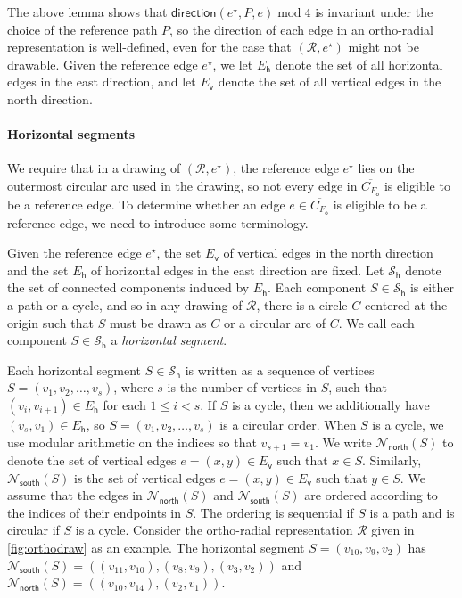 \documentclass{article}\usepackage[a4paper,margin=20mm]{geometry}
\newcommand{\RR}{\mathcal{R}}
\newcommand{\FO}{F_\mathsf{o}}
\newcommand{\EH}{E_\mathsf{h}}
\newcommand{\EV}{E_\mathsf{v}}
\newcommand{\PH}{\mathcal{S}_\mathsf{h}}
\newcommand{\Nnorth}{\mathcal{N}_\mathsf{north}}
\newcommand{\Nsouth}{\mathcal{N}_\mathsf{south}}
\newcommand{\direction}{\mathsf{direction}}
\newcommand{\eref}{e^\star}
\renewcommand{\mod}{\operatorname{mod}}
\begin{document}
The above lemma shows that $\direction(\eref, P, e) \mod 4$ is invariant under the choice of the reference path $P$, so the direction of each edge in an ortho-radial representation is well-defined, even for the case that  $(\RR, \eref)$ might not be drawable. Given the reference edge $\eref$, we let $\EH$ denote the set of all horizontal edges in the east direction, and let $\EV$ denote the set of all vertical edges in the north direction.



\paragraph{Horizontal segments} 
We require that in a drawing of $(\RR, \eref)$, the reference edge $\eref$ lies on the outermost circular arc used in the drawing, so not every edge in $\overline{C_{\FO}}$ is eligible to be a reference edge. To determine whether an edge $e \in \overline{C_{\FO}}$ is eligible to be a reference edge, we need to introduce some terminology.

Given the reference edge $\eref$, the set $\EV$ of vertical edges in the north direction  and the set $\EH$ of horizontal edges in the east direction  are fixed.
Let $\PH$ denote the set of connected components induced by $\EH$. Each component $S \in \PH$ is either a path or a cycle, and so in any drawing of $\RR$, there is a circle $C$ centered at the origin such that $S$ must be drawn as $C$ or a circular arc of $C$. We call each component $S \in \PH$ a \emph{horizontal segment}.

Each horizontal segment $S \in \PH$ is written as a sequence of vertices $S=(v_1, v_2, \ldots, v_s)$, where $s$ is the number of vertices in $S$, such that $(v_i, v_{i+1}) \in \EH$ for each $1 \leq i < s$. If $S$ is a cycle, then we additionally have $(v_s, v_1) \in \EH$, so $S=(v_1, v_2, \ldots, v_s)$ is a circular order. When $S$ is a cycle, we use modular arithmetic on the indices so that $v_{s+1} = v_1$.
We write $\Nnorth(S)$ to denote the set of vertical edges $e = (x,y) \in \EV$ such that $x \in S$. Similarly, $\Nsouth(S)$ is the set of vertical edges $e = (x,y) \in \EV$ such that $y \in S$. We assume that the edges  in $\Nnorth(S)$ and $\Nsouth(S)$ are ordered according to the indices of their endpoints in $S$. The ordering is sequential if $S$ is a path and is circular if $S$ is a cycle. 
Consider the ortho-radial representation $\RR$ given in \cref{fig:orthodraw} as an example. The horizontal segment $S = (v_{10}, v_9, v_2)$ has $\Nsouth(S) = ((v_{11}, v_{10}), (v_8, v_9), (v_3, v_2))$ and $\Nnorth(S) = ((v_{10}, v_{14}), (v_2 ,v_1))$.
\end{document}
